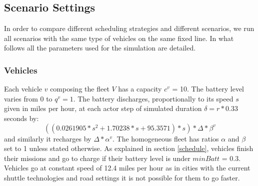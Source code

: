 \documentclass[12pt,a4paper]{article}
\begin{document}
\begin{table}
\caption{Simulation framework's parameters used}
\label{table:simparametersused}
\end{table}

\subsection{Scenario Settings}
In order to compare different scheduling strategies and different scenarios, we run all scenarios with the same type of vehicles on the same fixed line. In what follows all the parameters used for the simulation are detailed.
\subsubsection{Vehicles}\label{vparam}
Each vehicle $v$ composing the fleet $V$ has a capacity $c^{v}$ = 10. The battery level varies from 0 to $q^{v} = 1$. The battery discharges, proportionally to its speed $s$ given in miles per hour, at each actor step of simulated duration $\delta = r * 0.33$ seconds by:
$$((0.0261905 * s^{2} + 1.70238 * s + 95.3571) * s) * \Delta * \beta^{v}$$
and similarly it recharges by $ \Delta * \alpha^{v}$.
The homogeneous fleet has ratios $\alpha$ and $\beta$ set to 1 unless stated otherwise. As explained in section \ref{schedule}, vehicles finish their missions and go to charge if their battery level is under $minBatt$ = 0.3. Vehicles go at constant speed of 12.4 miles per hour as in cities with the current shuttle technologies and road settings it is not possible for them to go faster.
\end{document}
